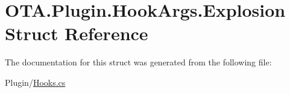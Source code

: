 \hypertarget{struct_o_t_a_1_1_plugin_1_1_hook_args_1_1_explosion}{}\section{O\+T\+A.\+Plugin.\+Hook\+Args.\+Explosion Struct Reference}
\label{struct_o_t_a_1_1_plugin_1_1_hook_args_1_1_explosion}


The documentation for this struct was generated from the following file\+:\begin{DoxyCompactItemize}
\item 
Plugin/\hyperlink{_hooks_8cs}{Hooks.\+cs}\end{DoxyCompactItemize}
